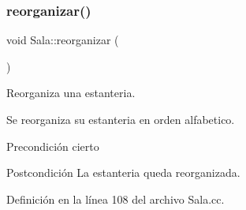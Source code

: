 \subsubsection{\texorpdfstring{reorganizar()}{reorganizar()}}
{\footnotesize\ttfamily void Sala\+::reorganizar (\begin{DoxyParamCaption}{ }\end{DoxyParamCaption})}



Reorganiza una estanteria. 

Se reorganiza su estanteria en orden alfabetico. \begin{DoxyPrecond}{Precondición}
cierto 
\end{DoxyPrecond}
\begin{DoxyPostcond}{Postcondición}
La estanteria queda reorganizada. 
\end{DoxyPostcond}


Definición en la línea 108 del archivo Sala.\+cc.


